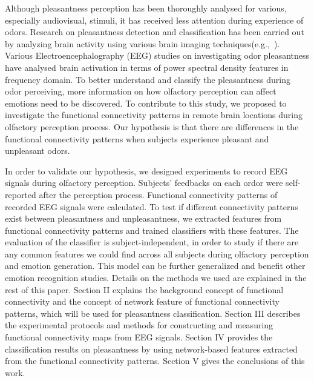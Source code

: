Although pleasantness perception has been thoroughly analysed for various, especially audiovisual, stimuli, it has received less attention during experience of odors. Research on pleasantness detection and classification has been carried out by analyzing brain activity using various brain imaging techniques(e.g.,~\cite{zatorre2000neural,kringelbach2003activation,kroupi2014eeg}). Various Electroencephalography (EEG) studies on investigating odor pleasantness have analysed brain activation in terms of power spectral density features in frequency domain. To better understand and classify the pleasantness during odor perceiving, more information on how olfactory perception can affect emotions need to be discovered. To contribute to this study, we proposed to investigate the functional connectivity patterns in remote brain locations during olfactory perception process. Our hypothesis is that there are differences in the functional connectivity patterns when subjects experience pleasant and unpleasant odors. 

In order to validate our hypothesis, we designed experiments to record EEG signals during olfactory perception. Subjects' feedbacks on each ordor were self-reported after the perception process. Functional connectivity patterns of recorded EEG signals were calculated. To test if different connectivity patterns exist between pleasantness and unpleasantness, we extracted features from functional connectivity patterns and trained classifiers with these features. The evaluation of the classifier is subject-independent, in order to study if there are any common features we could find across all subjects during olfactory perception and emotion generation. This model can be further generalized and benefit other emotion recognition studies. Details on the methods we used are explained in the rest of this paper. Section II explains the background concept of functional connectivity and the concept of network feature of functional connectivity patterns, which will be used for pleasantness classification. Section III describes the experimental protocols and methods for constructing and measuring functional connectivity maps from EEG signals. Section IV provides the classification results on pleasantness by using network-based features extracted from the functional connectivity patterns. Section V gives the conclusions of this work. 
